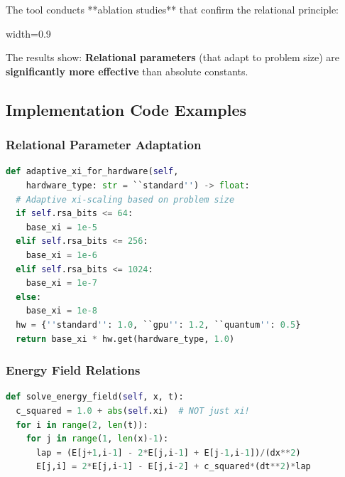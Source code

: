 	The tool conducts **ablation studies** that confirm the relational principle:
	
	\begin{table}[htbp]
		\centering
		\begin{adjustbox}{width=0.9\textwidth}
		\end{adjustbox}
		\caption{Empirical validation: Relational vs. absolute $\xi$-parameters}
		\label{tab:xi_validation}
	\end{table}
	
	The results show: \textbf{Relational parameters} (that adapt to problem size) are \textbf{significantly more effective} than absolute constants.
	
	\subsection{Implementation Code Examples}
	
	\subsubsection{Relational Parameter Adaptation}
	\begin{lstlisting}[language=Python,breaklines=true]
def adaptive_xi_for_hardware(self, 
    hardware_type: str = ``standard'') -> float:
  # Adaptive xi-scaling based on problem size
  if self.rsa_bits <= 64:
    base_xi = 1e-5
  elif self.rsa_bits <= 256:
    base_xi = 1e-6
  elif self.rsa_bits <= 1024:
    base_xi = 1e-7
  else:
    base_xi = 1e-8
  hw = {''standard'': 1.0, ``gpu'': 1.2, ``quantum'': 0.5}
  return base_xi * hw.get(hardware_type, 1.0)
	\end{lstlisting}
	
	\subsubsection{Energy Field Relations}
	\begin{lstlisting}[language=Python,breaklines=true]
def solve_energy_field(self, x, t):
  c_squared = 1.0 + abs(self.xi)  # NOT just xi!
  for i in range(2, len(t)):
    for j in range(1, len(x)-1):
      lap = (E[j+1,i-1] - 2*E[j,i-1] + E[j-1,i-1])/(dx**2)
      E[j,i] = 2*E[j,i-1] - E[j,i-2] + c_squared*(dt**2)*lap
	\end{lstlisting}
	
